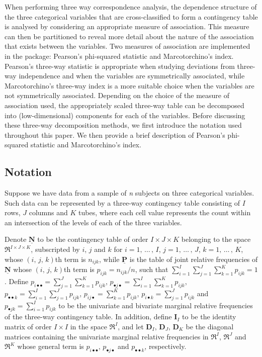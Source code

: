 When performing three way correspondence analysis, the dependence structure of the three categorical variables that are cross-classified to form a contingency table is analysed by considering an appropriate measure of association. This measure can then be partitioned to reveal more detail about the nature of the association that exists between the variables. Two measures of association are implemented in the  package: Pearson's phi-squared statistic and Marcotorchino's index. Pearson's three-way statistic is appropriate when studying deviations from three-way independence and when the variables are symmetrically associated, while Marcotorchino's three-way index is a more suitable choice when the variables are not symmetrically associated. 
Depending on the choice of the measure of association used, the appropriately scaled three-way table can be decomposed into (low-dimensional) components for each of the variables. Before discussing these three-way decomposition methods, we first introduce the notation used throughout this paper. We then provide a brief description of Pearson's phi-squared statistic and Marcotorchino's index. 
\subsection{Notation}
\label{s.notation}

Suppose we have data from a sample of {\it n} subjects on three categorical variables. Such data can be represented by a three-way contingency table consisting of $I$ rows, $J$ columns and $K$ tubes, where each cell value represents the count within an intersection of the levels of each of the three variables. 

Denote $\mathbf{\underline{N}}$ to be the contingency table of order ${I \times J \times K}$ belonging to the space $\Re^{ I\times J \times K}$, subscripted by $i$, $j$ and $k$ for $i=1,\, \ldots \,,\, I$, $j = 1,\, \ldots \,,\, J$, $k = 1,\, \ldots \,,\, K$,  whose $\left(i,\,j,\,k \right)$th term is $n_{ijk}$, while $\mathbf{ \underline{P}}$ is the table of joint relative frequencies of $\mathbf{\underline{N}}$ whose $\left(i,\,j,\,k \right)$th term is $p_{ijk} = n_{ijk} /n$, such that $\sum_{i=1}^I \sum_{j=1}^J \sum_{k=1}^K p_{ijk} = 1$. Define $p_{i\bullet \bullet} = \sum_{j=1}^J \sum_{k=1}^K p_{ijk}$, $p_{\bullet j  \bullet} = \sum_{i=1}^I \sum_{k=1}^K p_{ijk}$, $p_{\bullet \bullet k} = \sum_{i=1}^I \sum_{j=1}^J p_{ijk}$, $p_{ij \bullet} = \sum_{k=1}^K p_{ijk}$, $p_{i \bullet k} = \sum_{j=1}^J p_{ijk}$ and $p_{\bullet jk} = \sum_{i=1}^I p_{ijk}$ to be the univariate and bivariate marginal relative frequencies of the three-way contingency table. In addition, define $\mathbf{I}_I$ to be the identity matrix of order ${I\times I}$ in the space $\Re^I$, and let $\mathbf{ D}_I$, $\mathbf{D}_J$, $\mathbf{D}_K$ be the diagonal matrices containing the univariate marginal relative frequencies in $\Re^I$, $\Re^{ J}$ and $\Re^{ K}$ whose general term is $p_{i \bullet \bullet}$, $p_{\bullet j  \bullet}$ and $p_{\bullet \bullet k}$, respectively.

